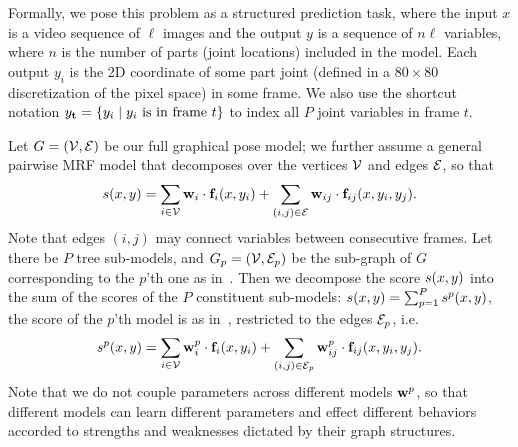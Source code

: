 Formally, we pose this problem as a structured prediction task, where
the input $x$ is a video sequence of $\ell$ images and the output $y$ is a
sequence of $n\ell$ variables, where $n$ is the number of parts (joint
locations) included in the model. Each output $y_i$ is the 2D
coordinate of some part joint (defined in a $80 \times 80$
discretization of the pixel space) in some frame.  We also use the shortcut notation 
$y_{\bf t} = \{ y_i \;|\; y_i \text{ is in frame } t \}$
to index all $P$ joint variables in frame $t$.  



Let $G = (\mathcal{V},\mathcal{E})$ be our full graphical
pose model; we further assume a general pairwise MRF model that decomposes over 
the vertices $\mathcal{V}$ and edges $\mathcal{E}$, so that
\begin{equation}
  \label{eq:loopy-model}
  s(x,y) = \sum_{i \in \mathcal{V}}\mathbf{w}_i \cdot \mathbf{f}_i(x,y_i) + \sum_{(i,j) \in \mathcal{E}}\mathbf{w}_{ij} 
\cdot \mathbf{f}_{ij}(x,y_i,y_j).  \end{equation}
Note that edges $(i,j)$ may connect variables between consecutive
frames. Let there be $P$ tree sub-models, and $G_p = (\mathcal{V}, \mathcal{E}_p)$ be the sub-graph of $G$ corresponding
to the $p$'th one as in~.  Then
we decompose the score $s(x,y)$ into the sum of the scores of the
$P$ constituent sub-models: $s(x,y) = \sum_{p=1}^P s^p(x,y)$, the
score of the $p$'th model is as in~, restricted to the
edges $\mathcal{E}_p$, i.e. 
\begin{equation}
s^p(x,y) = \sum_{i\in\mathcal{V}}\mathbf{w}_i^p \cdot \mathbf{f}_i(x,y_i) + 
\sum_{(i,j)\in\mathcal{E}_p}\mathbf{w}_{ij}^p \cdot \mathbf{f}_{ij}(x,y_i,y_j).
\end{equation}
Note that we do not couple parameters across different models $\mathbf{w}^p$, so that different models can learn different parameters and effect different behaviors accorded to strengths and weaknesses dictated by their graph structures.

